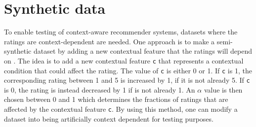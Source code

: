 \section{Synthetic data}
To enable testing of context-aware recommender systems, datasets where the ratings are context-dependent are needed.
One approach is to make a semi-synthetic dataset by adding a new contextual feature that the ratings will depend on \cite{baltrunasContextItemSplit}.
The idea is to add a new contextual feature \texttt{c} that represents a contextual condition that could affect the rating.
The value of \texttt{c} is either 0 or 1. 
If \texttt{c} is 1, the corresponding rating between 1 and 5 is increased by 1, if it is not already 5.
If \texttt{c} is 0, the rating is instead decreased by 1 if is not already 1.
An $\alpha$ value is then chosen between 0 and 1 which determines the fractions of ratings that are affected by the contextual feature \texttt{c}.
By using this method, one can modify a dataset into being artificially context dependent for testing purposes.
